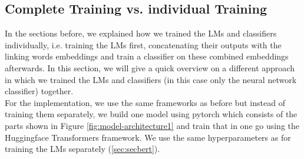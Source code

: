 \subsection{Complete Training vs. individual Training}
In the sections before, we explained how we trained the LMs and classifiers individually, i.e. training the LMs first, concatenating their outputs with the linking words embeddings and train a classifier on these combined embeddings afterwards. In this section, we will give a quick overview on a different approach in which we trained the LMs and classifiers (in this case only the neural network classifier) together. \\
For the implementation, we use the same frameworks as before but instead of training them separately, we build one model using pytorch which consists of the parts shown in Figure \ref{fig:model-architecture1} and train that in one go using the Huggingface Transformers framework. We use the same hyperparameters as for training the LMs separately (\ref{sec:secbert}).